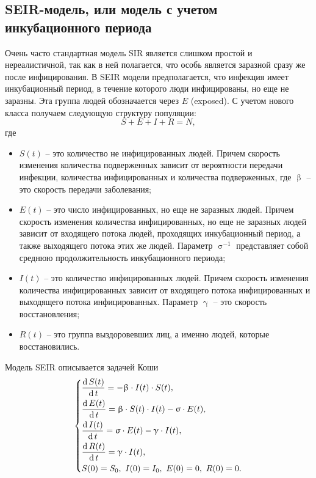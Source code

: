 \documentclass[a4paper, 14pt]{extreport}
\numberwithin{equation}{section}
\renewcommand{\beta}{\upbeta}
\renewcommand{\gamma}{\upgamma}
\renewcommand{\sigma}{\upsigma}
\renewcommand{\d}{\operatorname{d}}
\begin{document}
	\subsection{SEIR-модель, или модель с учетом инкубационного периода}
 	Очень часто стандартная модель SIR является слишком простой и
	нереалистичной, так как в ней полагается, что особь является заразной сразу же после инфицирования. В SEIR модели предполагается, что инфекция имеет инкубационный период, в течение которого люди инфицированы, но
	еще не заразны. Эта группа людей обозначается через $E$ (exposed). С учетом нового класса получаем следующую структуру
	популяции:
	$$S + E + I + R = N,$$ где
	\begin{itemize}
		\item $S(t)$ -- это количество не инфицированных людей. Причем скорость изменения количества подверженных зависит от вероятности передачи инфекции, количества инфицированных и количества подверженных, где $\beta$ -- это скорость передачи заболевания;
		\item $E(t)$ -- это число инфицированных, но еще не заразных людей. Причем скорость изменения количества инфицированных, но еще не заразных людей зависит от входящего потока людей, проходящих инкубационный период, а также выходящего потока этих же людей. Параметр $\sigma^{-1}$ представляет собой среднюю продолжительность инкубационного периода;
		\item $I(t)$ -- это количество инфицированных людей. Причем	скорость изменения количества инфицированных зависит от входящего потока инфицированных и выходящего потока инфицированных. Параметр $\gamma$ -- это скорость восстановления;
		\item $R(t)$ -- это группа выздоровевших лиц, а именно людей, которые восстановились.
	\end{itemize}
	Модель SEIR описывается задачей Коши
	\begin{equation}
		\begin{dcases}
		\dfrac {\d S(t)}{\d t} = - \beta \cdot I(t)\cdot S(t),\\
		\dfrac {\d E(t)}{\d t} = \beta \cdot S(t)\cdot I(t) - \sigma\cdot E(t),\\
		\dfrac{\d I(t)}{\d t} =\sigma \cdot E(t) - \gamma\cdot I(t),\\
		\dfrac{\d R(t)}{\d t} = \gamma\cdot I(t),\\
		S(0) = S_0,\ I(0) = I_0,\ E(0) = 0,\ R(0) = 0.
		\end{dcases}
	\end{equation}
	
\end{document}
